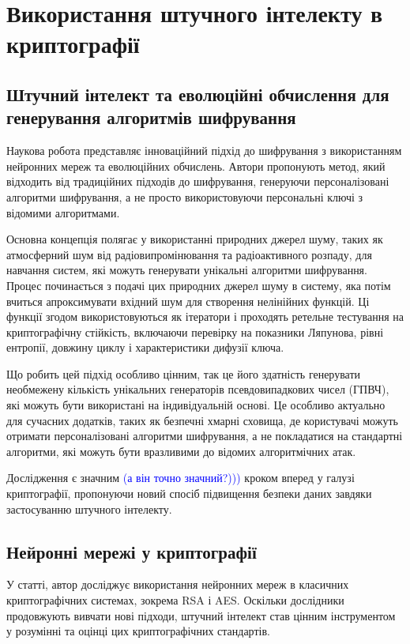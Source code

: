 
\section{Використання штучного інтелекту в криптографії}
\subsection{Штучний інтелект та еволюційні обчислення для генерування алгоритмів шифрування}
Наукова робота \cite{Cryptography using Artificial Intelligence Jonathan Blackledge} представляє інноваційний підхід до шифрування з використанням нейронних мереж та еволюційних обчислень. Автори пропонують метод, який відходить від традиційних підходів до шифрування, генеруючи персоналізовані алгоритми шифрування, а не просто використовуючи персональні ключі з відомими алгоритмами.

Основна концепція полягає у використанні природних джерел шуму, таких як атмосферний шум від радіовипромінювання та радіоактивного розпаду, для навчання систем, які можуть генерувати унікальні алгоритми шифрування. Процес починається з подачі цих природних джерел шуму в систему, яка потім вчиться апроксимувати вхідний шум для створення нелінійних функцій. Ці функції згодом використовуються як ітератори і проходять ретельне тестування на криптографічну стійкість, включаючи перевірку на показники Ляпунова, рівні ентропії, довжину циклу і характеристики дифузії ключа.

Що робить цей підхід особливо цінним, так це його здатність генерувати необмежену кількість унікальних генераторів псевдовипадкових чисел (ГПВЧ), які можуть бути використані на індивідуальній основі. Це особливо актуально для сучасних додатків, таких як безпечні хмарні сховища, де користувачі можуть отримати персоналізовані алгоритми шифрування, а не покладатися на стандартні алгоритми, які можуть бути вразливими до відомих алгоритмічних атак.


Дослідження є значним \textcolor{blue}{(а він точно значний?)))} кроком вперед у галузі криптографії, пропонуючи новий спосіб підвищення безпеки даних завдяки застосуванню штучного інтелекту.

\subsection{Нейронні мережі у криптографії}
У статті\cite{Applications of Neural Network-Based AI in Cryptography}, автор досліджує використання нейронних мереж в класичних криптографічних системах, зокрема RSA і AES. Оскільки дослідники продовжують вивчати нові підходи, штучний інтелект став цінним інструментом у розумінні та оцінці цих криптографічних стандартів.

